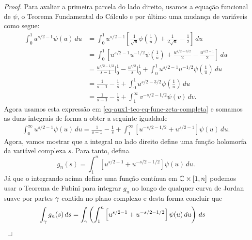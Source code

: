 \begin{proof}
        Para avaliar a primeira parcela do lado direito, usamos a equação funcional de $\psi$, o Teorema Fundamental do Cálculo e por último uma mudança de variáveis como segue:
        \begin{align*}
            \int_0^1 u^{s/2 - 1}\psi(u) \, du 
            &= 
            \int_0^1 u^{s/2 - 1}
            \left[
                \frac{1}{\sqrt{u}}\psi\left(\frac{1}{u}\right) 
                + \frac{1}{2\sqrt{u}} - \frac{1}{2}
            \right] \, du 
            \\[0.3cm]
            &= 
            \int_0^1
            \left[
                u^{s/2 - 1}u^{-1/2}\psi\left(\frac{1}{u}\right) 
                + \frac{u^{s/2 - 3/2}}{2} - \frac{u^{s/2 - 1}}{2}
            \right] \, du
            \\[0.3cm]
            &= 
            \frac{u^{s/2 - 1/2}}{s-1}\Bigg|_0^1 - \frac{u^{s/2}}{s}\Bigg|_0^1 
            + \int_0^1 u^{s/2 - 1}u^{-1/2}\psi\left(\frac{1}{u}\right) \, du 
            \\[0.3cm]
            &= \frac{1}{s-1} - \frac{1}{s} + \int_0^1 u^{s/2 - 3/2}\psi\left(\frac{1}{u}\right) \, du 
            \\[0.3cm]
            &= \frac{1}{s-1} - \frac{1}{s} + \int_1^{\infty} v^{-s/2 - 1/2}\psi(v) \, dv.
        \end{align*}
        Agora usamos esta expressão em 
        \eqref{eq-aux1-teo-eq-func-zeta-completa} e somamos as duas integrais de forma a obter a seguinte igualdade
        \begin{align*}
            \int_0^{\infty} u^{s/2 - 1}\psi(u) \, du
            = \frac{1}{s-1} - \frac{1}{s} + 
            \int_1^{\infty} \left[u^{-s/2 - 1/2} + u^{s/2 - 1}\right]\psi(u) \, du.
        \end{align*}
        Agora, vamos mostrar que a integral no lado direito define uma função holomorfa da variável complexa $s$.
        Para tanto, defina
        \[
        g_n(s) = \int_1^n \left[ u^{s/2 - 1} + u^{-s/2 - 1/2} \right] \psi(u) \, du.
        \]
        Já que o integrando acima define uma função contínua em $\mathbb{C}\times [1,n]$ podemos usar o Teorema de Fubini para integrar $g_n$ ao longo de  
        qualquer curva de Jordan suave por partes  
        $\gamma$ contida no plano complexo e desta forma concluir que
        \begin{align*}
            \int_{\y} g_n(s) \, ds 
            &=\int_{\y} \left( 
            \int_1^n \left[ u^{s/2 - 1} + u^{-s/2 - 1/2} \right] \psi(u) \, du \right) \, ds 

\end{align*}
\end{proof}
